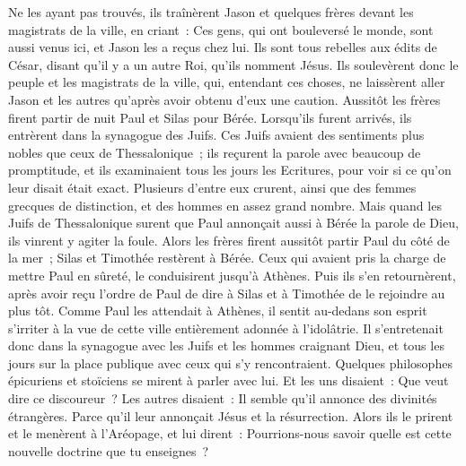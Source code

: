 \begin{multicols}{2}
Ne les ayant pas trouvés, ils traînèrent Jason et quelques frères devant les magistrats de la ville, en criant~: Ces gens, qui ont bouleversé le monde, sont aussi venus ici, et Jason les a reçus chez lui.
Ils sont tous rebelles aux édits de César, disant qu'il y a un autre Roi, qu'ils nomment Jésus.
Ils soulevèrent donc le peuple et les magistrats de la ville, qui, entendant ces choses,
ne laissèrent aller Jason et les autres qu'après avoir obtenu d'eux une caution. 
Aussitôt les frères firent partir de nuit Paul et Silas pour Bérée. Lorsqu'ils furent arrivés, ils entrèrent dans la synagogue des Juifs.
Ces Juifs avaient des sentiments plus nobles que ceux de Thessalonique~; ils reçurent la parole avec beaucoup de promptitude, et ils examinaient tous les jours les Ecritures, pour voir si ce qu'on leur disait était exact.
Plusieurs d'entre eux crurent, ainsi que des femmes grecques de distinction, et des hommes en assez grand nombre.
Mais quand les Juifs de Thessalonique surent que Paul annonçait aussi à Bérée la parole de Dieu, ils vinrent y agiter la foule.
Alors les frères firent aussitôt partir Paul du côté de la mer~; Silas et Timothée restèrent à Bérée.
Ceux qui avaient pris la charge de mettre Paul en sûreté, le conduisirent jusqu'à Athènes. Puis ils s'en retournèrent, après avoir reçu l'ordre de Paul de dire à Silas et à Timothée de le rejoindre au plus tôt.
Comme Paul les attendait à Athènes, il sentit au-dedans son esprit s'irriter à la vue de cette ville entièrement adonnée à l'idolâtrie.
Il s'entretenait donc dans la synagogue avec les Juifs et les hommes craignant Dieu, et tous les jours sur la place publique avec ceux qui s'y rencontraient.
Quelques philosophes épicuriens et stoïciens se mirent à parler avec lui. Et les uns disaient~: Que veut dire ce discoureur~? Les autres disaient~: Il semble qu'il annonce des divinités étrangères. Parce qu'il leur annonçait Jésus et la résurrection.
Alors ils le prirent et le menèrent à l'Aréopage, et lui dirent~: Pourrions-nous savoir quelle est cette nouvelle doctrine que tu enseignes~?

\end{multicols}
